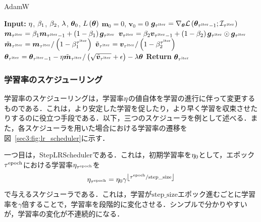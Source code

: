\begin{algorithm}
    \caption{AdamW}
    \label{sec3:algo:adamw}
    \begin{algorithmic}[1]
        \State \textbf{Input:} $\eta$, $\beta_{1}$, $\beta_{2}$, $\lambda$, $\bm{\theta}_{0}$, $L\left(\bm{\theta}\right)$
        \State $\bm{m}_{0} = 0$, $\bm{v}_{0} = 0$
        \State $\bm{g}_{\tau^{\text{iter}}} = \nabla_{\bm{\theta}} \mathcal{L}\left(\bm{\theta}_{\tau^{\text{iter}} - 1}; \mathcal{I}_{\tau^{\text{iter}}}\right)$
        \State $\bm{m}_{\tau^{\text{iter}}} = \beta_{1} \bm{m}_{\tau^{\text{iter}} - 1} + \left(1 - \beta_{1}\right) \bm{g}_{\tau^{\text{iter}}}$
        \State $\bm{v}_{\tau^{\text{iter}}} = \beta_{2} \bm{v}_{\tau^{\text{iter}} - 1} + \left(1 - \beta_{2}\right) \bm{g}_{\tau^{\text{iter}}} \odot \bm{g}_{\tau^{\text{iter}}}$
        \State $\tilde{\bm{m}}_{\tau^{\text{iter}}} = \bm{m}_{\tau^{\text{iter}}} / \left(1 - \beta_{1}^{\tau^{\text{iter}}}\right)$
        \State $\tilde{\bm{v}}_{\tau^{\text{iter}}} = \bm{v}_{\tau^{\text{iter}}} / \left(1 - \beta_{2}^{\tau^{\text{iter}}}\right)$
        \State $\bm{\theta}_{\tau^{\text{iter}}} = \bm{\theta}_{\tau^{\text{iter}} - 1} - \eta \tilde{\bm{m}}_{\tau^{\text{iter}}} / \left(\sqrt{\tilde{\bm{v}}_{\tau^{\text{iter}}}} + \epsilon\right) - \lambda \bm{\theta}$
        \EndFor
        \State \textbf{Return} $\bm{\theta}_{\tau^{\text{iter}}}$
    \end{algorithmic}
\end{algorithm}

\subsubsection{学習率のスケジューリング}
学習率のスケジューリングは，学習率$\eta$の値自体を学習の進行に伴って変更するものである．これは，より安定した学習を促したり，より早く学習を収束させたりするのに役立つ手段である．以下，三つのスケジューラを例として述べる．また，各スケジューラを用いた場合における学習率の遷移を図~\ref{sec3:fig:lr_scheduler}に示す．

一つ目は，StepLRSchedulerである．これは，初期学習率を$\eta_{0}$として，エポック$\tau^{\text{epoch}}$における学習率$\eta_{\tau^{\text{epoch}}}$を
\begin{equation}
    \eta_{\tau^{\text{epoch}}} = \eta_{0} \gamma^{\left\lfloor \tau^{\text{epoch}} / \text{step\_size} \right\rfloor}
\end{equation}
で与えるスケジューラである．これは，学習が$\text{step\_size}$エポック進むごとに学習率を$\gamma$倍することで，学習率を段階的に変化させる．シンプルで分かりやすいが，学習率の変化が不連続的になる．

